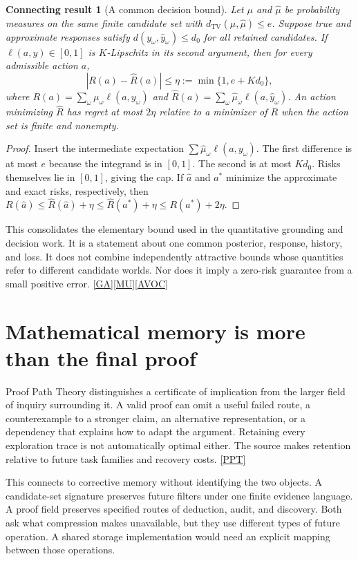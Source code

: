 \documentclass[11pt,oneside]{article}
\newcommand{\src}[1]{\hyperlink{cat:#1}{\textsf{[#1]}}}
\newtheorem{connection}{Connecting result}
\newcommand{\TV}{d_{\mathrm{TV}}}
\begin{document}
\begin{connection}[A common decision bound]
Let $\mu$ and $\widehat\mu$ be probability measures on the same finite candidate set with $\TV(\mu,\widehat\mu)\leq e$. Suppose true and approximate responses satisfy $d(y_\omega,\widehat y_\omega)\leq d_0$ for all retained candidates. If $\ell(a,y)\in[0,1]$ is $K$-Lipschitz in its second argument, then for every admissible action $a$,
\[
|R(a)-\widehat R(a)|\leq\eta:=\min\{1,e+Kd_0\},
\]
where $R(a)=\sum_\omega\mu_\omega\ell(a,y_\omega)$ and $\widehat R(a)=\sum_\omega\widehat\mu_\omega\ell(a,\widehat y_\omega)$. An action minimizing $\widehat R$ has regret at most $2\eta$ relative to a minimizer of $R$ when the action set is finite and nonempty.
\end{connection}
\begin{proof}
Insert the intermediate expectation $\sum\widehat\mu_\omega\ell(a,y_\omega)$. The first difference is at most $e$ because the integrand is in $[0,1]$. The second is at most $Kd_0$. Risks themselves lie in $[0,1]$, giving the cap. If $\widehat a$ and $a^*$ minimize the approximate and exact risks, respectively, then $R(\widehat a)\leq\widehat R(\widehat a)+\eta\leq\widehat R(a^*)+\eta\leq R(a^*)+2\eta$.
\end{proof}

This consolidates the elementary bound used in the quantitative grounding and decision work. It is a statement about one common posterior, response, history, and loss. It does not combine independently attractive bounds whose quantities refer to different candidate worlds. Nor does it imply a zero-risk guarantee from a small positive error. \src{GA}\src{MU}\src{AVOC}

\section{Mathematical memory is more than the final proof}
Proof Path Theory distinguishes a certificate of implication from the larger field of inquiry surrounding it. A valid proof can omit a useful failed route, a counterexample to a stronger claim, an alternative representation, or a dependency that explains how to adapt the argument. Retaining every exploration trace is not automatically optimal either. The source makes retention relative to future task families and recovery costs. \src{PPT}

This connects to corrective memory without identifying the two objects. A candidate-set signature preserves future filters under one finite evidence language. A proof field preserves specified routes of deduction, audit, and discovery. Both ask what compression makes unavailable, but they use different types of future operation. A shared storage implementation would need an explicit mapping between those operations.
\end{document}
